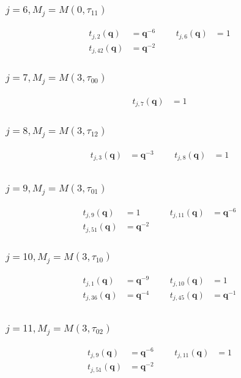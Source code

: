 \subsubsection{$j=6, M_{j}=M(0,\tau_{11})$}
\begin{align*}
t_{j,2}(\boldsymbol{q})&=\boldsymbol{q}^{-6} &&& t_{j,6}(\boldsymbol{q})&=1 \\
t_{j,42}(\boldsymbol{q})&=\boldsymbol{q}^{-2}
\end{align*}

\subsubsection{$j=7, M_{j}=M(3,\tau_{00})$}
\begin{align*}
t_{j,7}(\boldsymbol{q})&=1
\end{align*}

\subsubsection{$j=8, M_{j}=M(3,\tau_{12})$}
\begin{align*}
t_{j,3}(\boldsymbol{q})&=\boldsymbol{q}^{-3} &&& t_{j,8}(\boldsymbol{q})&=1 \\
\end{align*}

\subsubsection{$j=9, M_{j}=M(3,\tau_{01})$}
\begin{align*}
t_{j,9}(\boldsymbol{q})&=1 &&& t_{j,11}(\boldsymbol{q})&=\boldsymbol{q}^{-6} \\
t_{j,51}(\boldsymbol{q})&=\boldsymbol{q}^{-2}
\end{align*}

\subsubsection{$j=10, M_{j}=M(3,\tau_{10})$}
\begin{align*}
t_{j,1}(\boldsymbol{q})&=\boldsymbol{q}^{-9} &&& t_{j,10}(\boldsymbol{q})&=1 \\
t_{j,36}(\boldsymbol{q})&=\boldsymbol{q}^{-4} &&& t_{j,45}(\boldsymbol{q})&=\boldsymbol{q}^{-1} \\
\end{align*}

\subsubsection{$j=11, M_{j}=M(3,\tau_{02})$}
\begin{align*}
t_{j,9}(\boldsymbol{q})&=\boldsymbol{q}^{-6} &&& t_{j,11}(\boldsymbol{q})&=1 \\
t_{j,51}(\boldsymbol{q})&=\boldsymbol{q}^{-2}
\end{align*}


